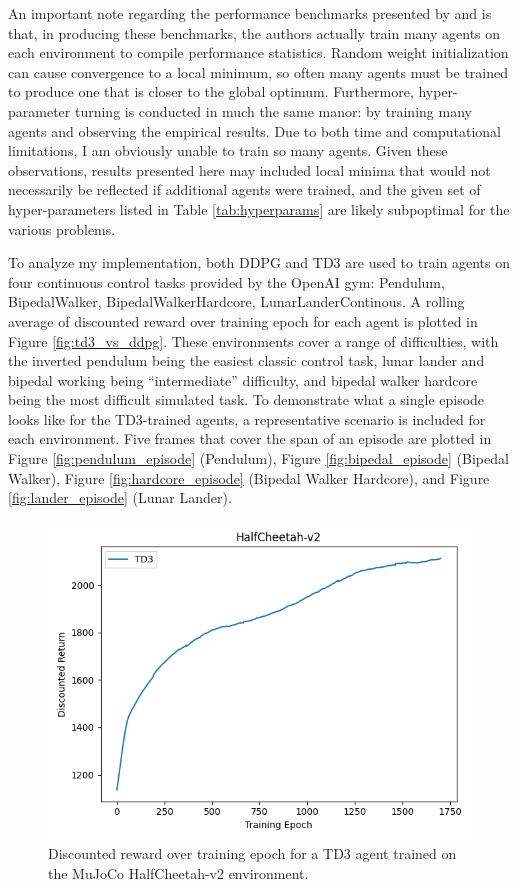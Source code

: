 \documentclass{article}
\begin{document}
An important note regarding the performance benchmarks presented by \cite{td3} and \cite{SpinningUp2018} is that, in producing these benchmarks, the authors actually train many agents on each environment to compile performance statistics. Random weight initialization can cause convergence to a local minimum, so often many agents must be trained to produce one that is closer to the global optimum. Furthermore, hyper-parameter turning is conducted in much the same manor: by training many agents and observing the empirical results. Due to both time and computational limitations, I am obviously unable to train so many agents. Given these observations, results presented here may included local minima that would not necessarily be reflected if additional agents were trained, and the given set of hyper-parameters listed in Table \ref{tab:hyperparams} are likely subpoptimal for the various problems.

To analyze my implementation, both DDPG and TD3 are used to train agents on four continuous control tasks provided by the OpenAI gym: Pendulum, BipedalWalker, BipedalWalkerHardcore, LunarLanderContinous. A rolling average of discounted reward over training epoch for each agent is plotted in Figure \ref{fig:td3_vs_ddpg}. These environments cover a range of difficulties, with the inverted pendulum being the easiest classic control task, lunar lander and bipedal working being ``intermediate'' difficulty, and bipedal walker hardcore being the most difficult simulated task. To demonstrate what a single episode looks like for the TD3-trained agents, a representative scenario is included for each environment. Five frames that cover the span of an episode are plotted in Figure \ref{fig:pendulum_episode} (Pendulum), Figure \ref{fig:bipedal_episode} (Bipedal Walker), Figure \ref{fig:hardcore_episode} (Bipedal Walker Hardcore), and Figure \ref{fig:lander_episode} (Lunar Lander).


\begin{figure}[!b]
\centering
\includegraphics[scale=0.4]{figures/halfcheetah}
\caption{Discounted reward over training epoch for a TD3 agent trained on the MuJoCo HalfCheetah-v2 environment.}
\end{figure}
\end{document}
